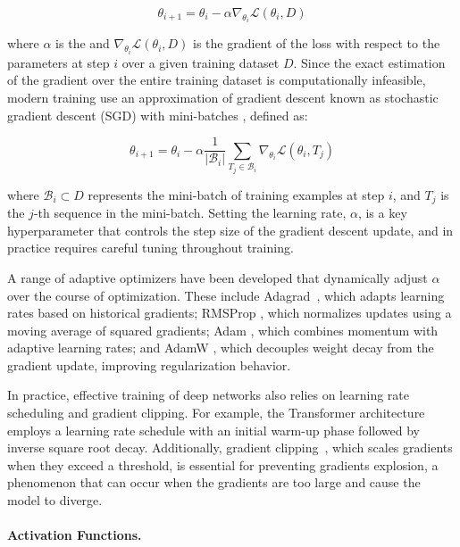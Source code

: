\begin{equation}
    \theta_{i+1} = \theta_i - \alpha \nabla_{\theta_i} \mathcal{L}(\theta_i, D)
\end{equation}

where $\alpha$ is the  and $\nabla_{\theta_i} \mathcal{L}(\theta_i, D)$ is the gradient of the loss with respect to the parameters at step $i$ over a given training dataset $D$. Since the exact estimation of the gradient over the entire training dataset is computationally infeasible, modern training use an approximation of gradient descent known as stochastic gradient descent (SGD) with mini-batches \citep{robbins1951stochastic}, defined as:

\begin{equation}
    \theta_{i+1} = \theta_i - \alpha  \frac{1}{\lvert \mathcal{B}_i\rvert} \sum_{T_j \in \mathcal{B}_i} \nabla_{\theta_i} \mathcal{L}(\theta_i, T_j)
\end{equation}

where $\mathcal{B}_i \subset D$ represents the mini-batch of training examples at step $i$, and $T_j$ is the $j$-th sequence in the mini-batch. Setting the learning rate, $\alpha$, is a key hyperparameter that controls the step size of the gradient descent update, and in practice requires careful tuning throughout training.

A range of adaptive optimizers have been developed that dynamically adjust $\alpha$ over the course of optimization. These include Adagrad~\citep{duchi2011adaptive}, which adapts learning rates based on historical gradients; RMSProp \citep{tieleman2012lecture}, which normalizes updates using a moving average of squared gradients; Adam \citep{kingma2015adam}, which combines momentum with adaptive learning rates; and AdamW \citep{loshchilov2019decoupled}, which decouples weight decay from the gradient update, improving regularization behavior.

In practice, effective training of deep networks also relies on learning rate scheduling and gradient clipping. For example, the Transformer architecture~\citep{vaswani2017attention} employs a learning rate schedule with an initial warm-up phase followed by inverse square root decay. Additionally, gradient clipping~\citep{pascanu2013difficulty}, which scales gradients when they exceed a threshold, is essential for preventing gradients explosion, a phenomenon that can occur when the gradients are too large and cause the model to diverge.

\paragraph{Activation Functions.} 

